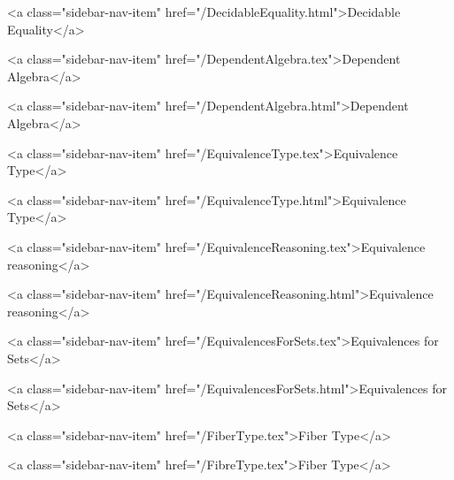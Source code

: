       
        
          <a class="sidebar-nav-item" href="/DecidableEquality.html">Decidable Equality</a>
        
      
    
      
        
          <a class="sidebar-nav-item" href="/DependentAlgebra.tex">Dependent Algebra</a>
        
      
    
      
        
          <a class="sidebar-nav-item" href="/DependentAlgebra.html">Dependent Algebra</a>
        
      
    
      
        
          <a class="sidebar-nav-item" href="/EquivalenceType.tex">Equivalence Type</a>
        
      
    
      
        
          <a class="sidebar-nav-item" href="/EquivalenceType.html">Equivalence Type</a>
        
      
    
      
        
          <a class="sidebar-nav-item" href="/EquivalenceReasoning.tex">Equivalence reasoning</a>
        
      
    
      
        
          <a class="sidebar-nav-item" href="/EquivalenceReasoning.html">Equivalence reasoning</a>
        
      
    
      
        
          <a class="sidebar-nav-item" href="/EquivalencesForSets.tex">Equivalences for Sets</a>
        
      
    
      
        
          <a class="sidebar-nav-item" href="/EquivalencesForSets.html">Equivalences for Sets</a>
        
      
    
      
        
          <a class="sidebar-nav-item" href="/FiberType.tex">Fiber Type</a>
        
      
    
      
        
          <a class="sidebar-nav-item" href="/FibreType.tex">Fiber Type</a>
        
